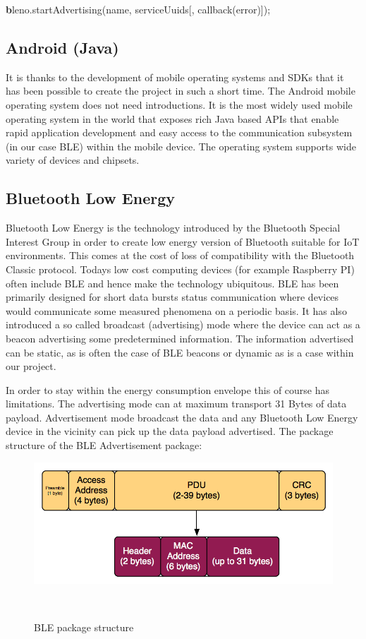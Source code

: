 \smallskip
{\textbf bleno.startAdvertising(name, serviceUuids[, callback(error)]);}
\newline
\smallskip

\subsection{Android (Java)}
\label{subsec:android}
It is thanks to the development of mobile operating systems and SDKs that it has been possible to create the project in such a short time. The Android mobile operating system \citep{android} does not need introductions. It is the most widely used mobile operating system in the world that exposes rich Java based APIs that enable rapid application development and easy access to the communication subsystem (in our case BLE) within the mobile device. The operating system supports wide variety of devices and chipsets.


\subsection{Bluetooth Low Energy}
\label{subsec:bluetooth}
Bluetooth Low Energy is the technology introduced by the Bluetooth Special Interest Group \citep{bluetooth} in order to create low energy version of Bluetooth suitable for IoT environments. This comes at the cost of loss of compatibility with the Bluetooth Classic protocol. Todays low cost computing devices (for example Raspberry PI) often include BLE and hence make the technology ubiquitous. BLE has been primarily designed for short data bursts status communication where devices would communicate some measured phenomena on a periodic basis. It has also introduced a so called broadcast (advertising) mode where the device can act as a beacon advertising some predetermined information. The information advertised can be static, as is often the case of BLE beacons \citep{ferguson2017bluetooth} or dynamic as is a case within our project. 

\bigskip

In order to stay within the energy consumption envelope this of course has limitations. The advertising mode can at maximum transport 31 Bytes of data payload. Advertisement mode broadcast the data and any Bluetooth Low Energy device in the vicinity can pick up the data payload advertised. The package structure of the BLE Advertisement package:

\begin{figure}[H]
\centering
\includegraphics[scale=0.4]{gfx/blepacket}
\caption{BLE package structure}~\label{fig:blepacket}
\end{figure}

